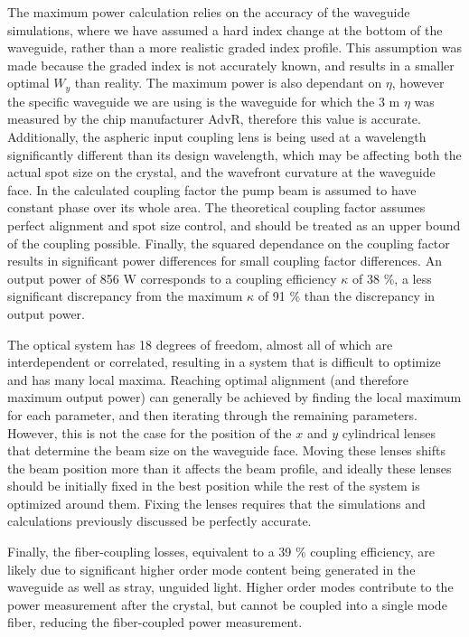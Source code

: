 \documentclass[9pt,twocolumn,twoside]{pnas-new}
\begin{document}
The maximum power calculation relies on the accuracy of the waveguide simulations, where we have assumed a hard index change at the bottom of the waveguide, rather than a more realistic graded index profile. This assumption was made because the graded index is not accurately known, and results in a smaller optimal $W_y$ than reality. The maximum power is also dependant on $\eta$, however the specific waveguide we are using is the waveguide for which the 3 \textmu m $\eta$ was measured by the chip manufacturer AdvR, therefore this value is accurate. Additionally, the aspheric input coupling lens is being used at a wavelength significantly different than its design wavelength, which may be affecting both the actual spot size on the crystal, and the wavefront curvature at the waveguide face. In the calculated coupling factor the pump beam is assumed to have constant phase over its whole area. The theoretical coupling factor assumes perfect alignment and spot size control, and should be treated as an upper bound of the coupling possible. Finally, the squared dependance on the coupling factor results in significant power differences for small coupling factor differences. An output power of 856 \textmu W corresponds to a coupling efficiency $\kappa$ of 38 \%, a less significant discrepancy from the maximum $\kappa$ of 91 \% than the discrepancy in output power.

The optical system has 18 degrees of freedom, almost all of which are interdependent or correlated, resulting in a system that is difficult to optimize and has many local maxima. Reaching optimal alignment (and therefore maximum output power) can generally be achieved by finding the local maximum for each parameter, and then iterating through the remaining parameters. However, this is not the case for the position of the $x$ and $y$ cylindrical lenses that determine the beam size on the waveguide face. Moving these lenses shifts the beam position more than it affects the beam profile, and ideally these lenses should be initially fixed in the best position while the rest of the system is optimized around them. Fixing the lenses requires that the simulations and calculations previously discussed be perfectly accurate. 

Finally, the fiber-coupling losses, equivalent to a 39 \% coupling efficiency, are likely due to significant higher order mode content being generated in the waveguide as well as stray, unguided light. Higher order modes contribute to the power measurement after the crystal, but cannot be coupled into a single mode fiber, reducing the fiber-coupled power measurement. 
\end{document}
